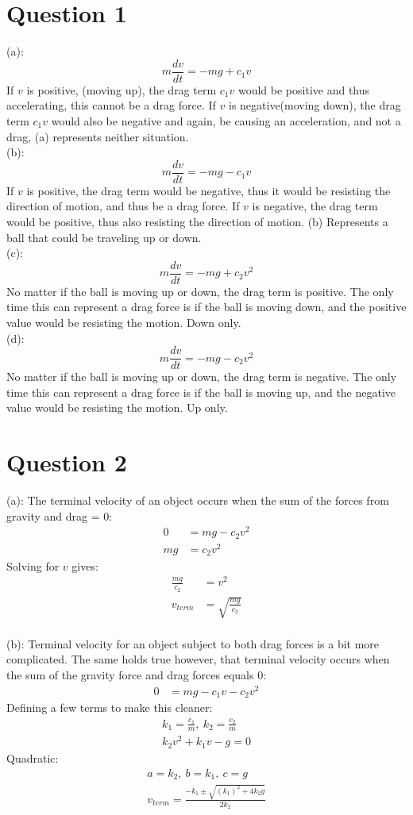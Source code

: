 \documentclass[a4paper,12pt]{article}
\begin{document}
\section*{Question 1}


(a): \[m\frac{dv}{dt}=-mg+c_1v\] 
If $v$ is positive, (moving up), the drag term $c_1v$ would be positive and thus accelerating, this cannot be a drag force.  If $v$ is negative(moving down), the drag term $c_1v$ would also be negative and again, be causing an acceleration, and not a drag, (a) represents neither situation.
\\
(b):\[m\frac{dv}{dt}=-mg-c_1v\]
If $v$ is positive, the drag term would be negative, thus it would be resisting the direction of motion, and thus be a drag force.  If $v$ is negative, the drag term would be positive, thus also resisting the direction of motion. (b) Represents a ball that could be traveling up or down.
\\
(c):\[m\frac{dv}{dt}=-mg+c_2v^2\] 
No matter if the ball is moving up or down, the drag term is positive.  The only time this can represent a drag force is if the ball is moving down, and the positive value would be resisting the motion.  Down only.
\\
(d):\[m\frac{dv}{dt}=-mg-c_2v^2\]
No matter if the ball is moving up or down, the drag term is negative.  The only time this can represent a drag force is if the ball is moving up, and the negative value would be resisting the motion. Up only.
\newpage
\section*{Question 2}
(a): The terminal velocity of an object occurs when the sum of the forces from gravity and drag = 0:
\begin{align*}
0&=mg-c_2v^2\\
mg&=c_2v^2
\end{align*}
Solving for $v$ gives:
\begin{align*}
\frac{mg}{c_2}&=v^2\\
v_{term}&=\sqrt{\frac{mg}{c_2}}
\end{align*}
\\
(b): Terminal velocity for an object subject to both drag forces is a bit more complicated.  The same holds true however, that terminal velocity occurs when the sum of the gravity force and drag forces equals 0:
\begin{align*}
0&=mg-c_1v-c_2v^2
\end{align*}
Defining a few terms to make this cleaner:
\begin{align*}
k_1=\frac{c_1}{m},\ k_2=\frac{c_2}{m}\\
k_2v^2+k_1v-g=0
\end{align*}
Quadratic:
\begin{align*}
a=k_2,\ b=k_1,\ c=g\\
v_{term}=\frac{-k_1\pm\sqrt{(k_1)^2+4k_2g}}{2k_2}
\end{align*}
\end{document}
